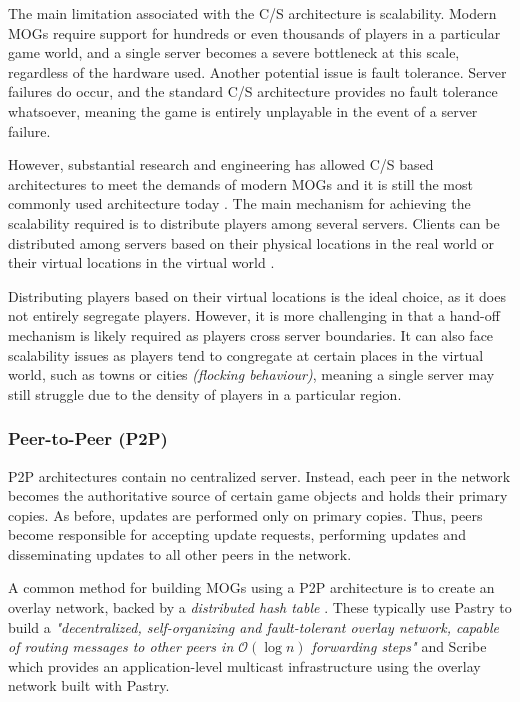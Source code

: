 The main limitation associated with the C/S architecture is scalability. Modern MOGs require support for hundreds or even thousands of players in a particular game world, and a single server becomes a severe bottleneck at this scale, regardless of the hardware used. Another potential issue is fault tolerance. Server failures do occur, and the standard C/S architecture provides no fault tolerance whatsoever, meaning the game is entirely unplayable in the event of a server failure.

However, substantial research and engineering has allowed C/S based architectures to meet the demands of modern MOGs and it is still the most commonly used architecture today \cite{p2p-mog-survey}. The main mechanism for achieving the scalability required is to distribute players among several servers. Clients can be distributed among servers based on their physical locations in the real world or their virtual locations in the virtual world \cite{dist-mog-loadsharing}.

Distributing players based on their virtual locations is the ideal choice, as it does not entirely segregate players. However, it is more challenging in that a hand-off mechanism is likely required as players cross server boundaries. It can also face scalability issues as players tend to congregate at certain places in the virtual world, such as towns or cities \textit{(flocking behaviour)}, meaning a single server may still struggle due to the density of players in a particular region. 

\subsubsection*{Peer-to-Peer (P2P)}
P2P architectures contain no centralized server. Instead, each peer in the network becomes the authoritative source of certain game objects and holds their primary copies. As before, updates are performed only on primary copies. Thus, peers become responsible for accepting update requests, performing updates and disseminating updates to all other peers in the network.

A common method for building MOGs using a P2P architecture is to create an overlay network, backed by a \textit{distributed hash table} \cite{p2p-mog-dht}. These typically use Pastry to build a \textit{"decentralized, self-organizing and fault-tolerant overlay network, capable of routing messages to other peers in $\mathcal{O}(\log{}n)$ forwarding steps"} \cite{pastry} and Scribe \cite{scribe} which provides an application-level multicast infrastructure using the overlay network built with Pastry.

